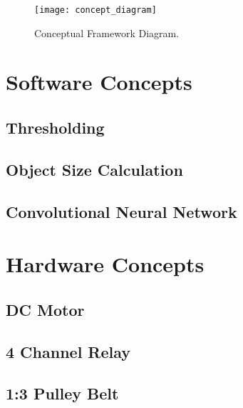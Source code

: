 \begin{figure}[!htbp]
	\centering
	\texttt{[image: concept\_diagram]}
	\caption{Conceptual Framework Diagram.}
	\label{fig:theoreticalDiagram2}
\end{figure}

\section{Software Concepts}

\subsection{Thresholding}

\subsection{Object Size Calculation}

\subsection{Convolutional Neural Network}

\section{Hardware Concepts}

\subsection{DC Motor}

\subsection{4 Channel Relay}

\subsection{1:3 Pulley Belt}


